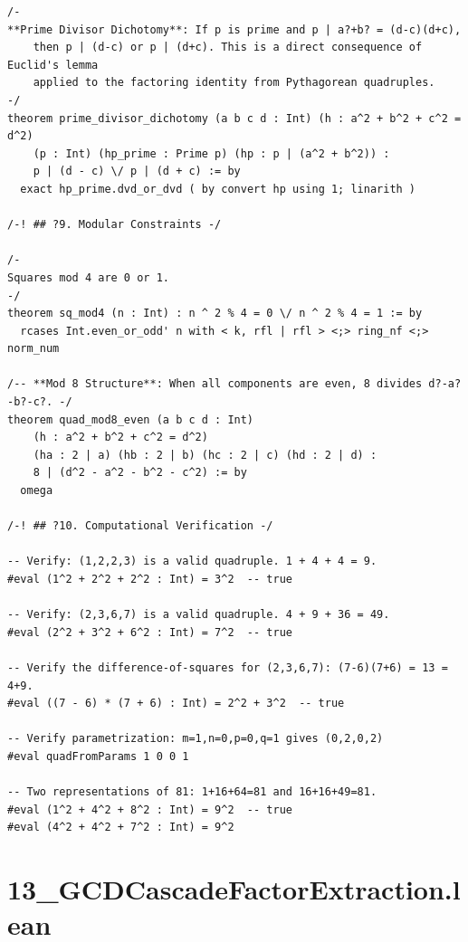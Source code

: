 \documentclass[11pt,twoside,openright]{book}
\theoremstyle{definition}
\theoremstyle{remark}
\begin{document}
\begin{lstlisting}[style=lean]
/-
**Prime Divisor Dichotomy**: If p is prime and p | a?+b? = (d-c)(d+c),
    then p | (d-c) or p | (d+c). This is a direct consequence of Euclid's lemma
    applied to the factoring identity from Pythagorean quadruples.
-/
theorem prime_divisor_dichotomy (a b c d : Int) (h : a^2 + b^2 + c^2 = d^2)
    (p : Int) (hp_prime : Prime p) (hp : p | (a^2 + b^2)) :
    p | (d - c) \/ p | (d + c) := by
  exact hp_prime.dvd_or_dvd ( by convert hp using 1; linarith )

/-! ## ?9. Modular Constraints -/

/-
Squares mod 4 are 0 or 1.
-/
theorem sq_mod4 (n : Int) : n ^ 2 % 4 = 0 \/ n ^ 2 % 4 = 1 := by
  rcases Int.even_or_odd' n with < k, rfl | rfl > <;> ring_nf <;> norm_num

/-- **Mod 8 Structure**: When all components are even, 8 divides d?-a?-b?-c?. -/
theorem quad_mod8_even (a b c d : Int)
    (h : a^2 + b^2 + c^2 = d^2)
    (ha : 2 | a) (hb : 2 | b) (hc : 2 | c) (hd : 2 | d) :
    8 | (d^2 - a^2 - b^2 - c^2) := by
  omega

/-! ## ?10. Computational Verification -/

-- Verify: (1,2,2,3) is a valid quadruple. 1 + 4 + 4 = 9.
#eval (1^2 + 2^2 + 2^2 : Int) = 3^2  -- true

-- Verify: (2,3,6,7) is a valid quadruple. 4 + 9 + 36 = 49.
#eval (2^2 + 3^2 + 6^2 : Int) = 7^2  -- true

-- Verify the difference-of-squares for (2,3,6,7): (7-6)(7+6) = 13 = 4+9.
#eval ((7 - 6) * (7 + 6) : Int) = 2^2 + 3^2  -- true

-- Verify parametrization: m=1,n=0,p=0,q=1 gives (0,2,0,2)
#eval quadFromParams 1 0 0 1

-- Two representations of 81: 1+16+64=81 and 16+16+49=81.
#eval (1^2 + 4^2 + 8^2 : Int) = 9^2  -- true
#eval (4^2 + 4^2 + 7^2 : Int) = 9^2
\end{lstlisting}

\clearpage

\section*{13\_GCDCascadeFactorExtraction.lean}
\end{document}
